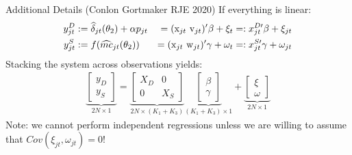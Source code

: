\documentclass[xcolor=pdftex,dvipsnames,table,mathserif,aspectratio=169]{beamer}
\begin{document}
\begin{frame}{Additional Details (Conlon Gortmaker RJE 2020)}
If everything is linear:
\begin{alignat*}{3}
\label{eq:stacked}
\nonumber y_{jt}^D &:= \widehat \delta_{jt}(\theta_2) + \alpha p_{jt} &=(\textrm{x}_{jt} \-\ \textrm{v}_{jt})' \beta + \xi_t &=: x_{jt}^{D\prime}\beta + \xi_{jt} \\ 
y_{jt}^S &:= f(\widehat{mc}_{jt}(\theta_2)) &= (\textrm{x}_{jt} \-\ \textrm{w}_{jt})'\gamma + \omega_t &=: x_{jt}^{S\prime} \gamma + \omega_{jt} 
\end{alignat*}
Stacking the system across observations yields:
\begin{align*}
\underbrace{\begin{bmatrix} y_D \\ y_S \end{bmatrix}}_{2N\times1} = 
\underbrace{\begin{bmatrix}
X_D & 0 \\
0 & X_S 
\end{bmatrix}}_{2N\times(K_1+K_3)}
\underbrace{\begin{bmatrix}
\beta \\ \gamma %
\end{bmatrix}}_{(K_1+K_3)\times1} + 
\underbrace{\begin{bmatrix}
\xi \\ \omega %
\end{bmatrix}}_{2N\times 1}
\end{align*}
Note: we cannot perform independent regressions unless we are willing to assume that $Cov(\xi_{jt},\omega_{jt})=0$!
\end{frame}
\end{document}
